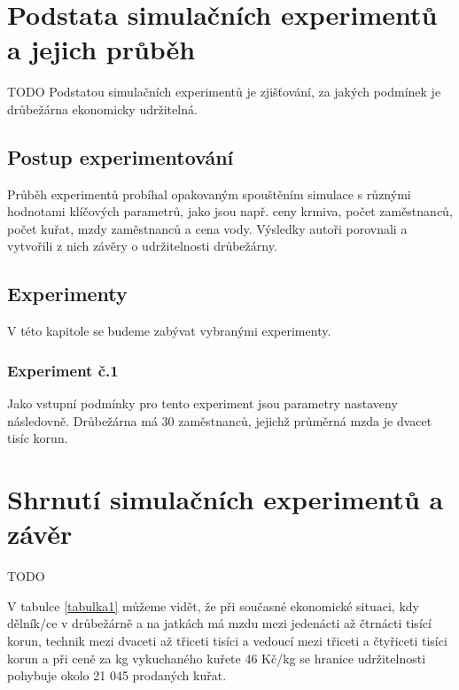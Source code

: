 \documentclass[a4paper,10pt]{article}
\begin{document}
\section{Podstata simulačních experimentů a jejich průběh}\label{experimenty}
TODO\newline
Podstatou simulačních experimentů je zjišťování, za jakých podmínek je drůbežárna ekonomicky udržitelná.
\subsection{Postup experimentování}
Průběh experimentů probíhal opakovaným spouštěním simulace s různými hodnotami klíčových parametrů, jako
jsou např. ceny krmiva, počet zaměstnanců, počet kuřat, mzdy zaměstnanců a cena vody.
Výsledky autoři porovnali a vytvořili z nich závěry o udržitelnosti drůbežárny.
\subsection{Experimenty}
V této kapitole se budeme zabývat vybranými experimenty.
\subsubsection{Experiment č.1}
Jako vstupní podmínky pro tento experiment jsou parametry nastaveny následovně.
Drůbežárna má 30 zaměstnanců, jejichž průměrná mzda je dvacet tisíc korun.

\section{Shrnutí simulačních experimentů a závěr}\label{zaver}
TODO

V tabulce \ref{tabulka1} můžeme vidět, že při současné ekonomické situaci, kdy dělník/ce v drůbežárně a na jatkách
má mzdu mezi jedenácti až čtrnácti tisící korun, technik mezi dvaceti až třiceti tisíci a vedoucí mezi třiceti
a čtyřiceti tisíci korun a při ceně za kg vykuchaného kuřete 46 Kč/kg se hranice udržitelnosti pohybuje okolo 
21 045 prodaných kuřat.

\begin{center}
\end{center}
\end{document}
